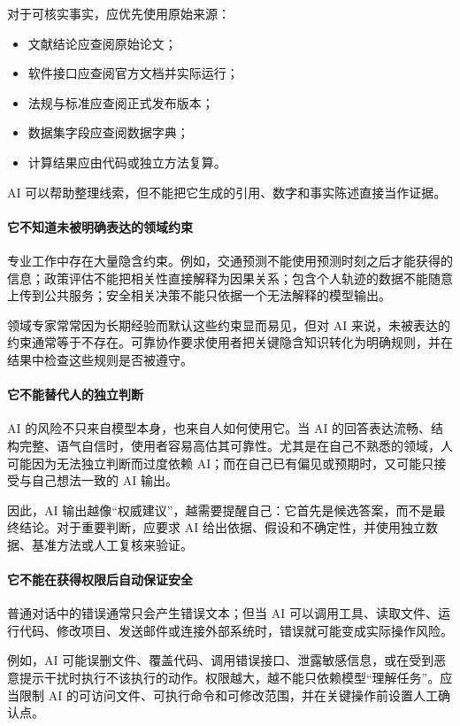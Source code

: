 对于可核实事实，应优先使用原始来源：

\begin{itemize}
\item 文献结论应查阅原始论文；
\item 软件接口应查阅官方文档并实际运行；
\item 法规与标准应查阅正式发布版本；
\item 数据集字段应查阅数据字典；
\item 计算结果应由代码或独立方法复算。
\end{itemize}

AI 可以帮助整理线索，但不能把它生成的引用、数字和事实陈述直接当作证据。

\paragraph{它不知道未被明确表达的领域约束}

专业工作中存在大量隐含约束。例如，交通预测不能使用预测时刻之后才能获得的信息；政策评估不能把相关性直接解释为因果关系；包含个人轨迹的数据不能随意上传到公共服务；安全相关决策不能只依据一个无法解释的模型输出。

领域专家常常因为长期经验而默认这些约束显而易见，但对 AI 来说，未被表达的约束通常等于不存在。可靠协作要求使用者把关键隐含知识转化为明确规则，并在结果中检查这些规则是否被遵守。

\paragraph{它不能替代人的独立判断}

AI 的风险不只来自模型本身，也来自人如何使用它。当 AI 的回答表达流畅、结构完整、语气自信时，使用者容易高估其可靠性。尤其是在自己不熟悉的领域，人可能因为无法独立判断而过度依赖 AI；而在自己已有偏见或预期时，又可能只接受与自己想法一致的 AI 输出。

因此，AI 输出越像“权威建议”，越需要提醒自己：它首先是候选答案，而不是最终结论。对于重要判断，应要求 AI 给出依据、假设和不确定性，并使用独立数据、基准方法或人工复核来验证。

\paragraph{它不能在获得权限后自动保证安全}

普通对话中的错误通常只会产生错误文本；但当 AI 可以调用工具、读取文件、运行代码、修改项目、发送邮件或连接外部系统时，错误就可能变成实际操作风险。

例如，AI 可能误删文件、覆盖代码、调用错误接口、泄露敏感信息，或在受到恶意提示干扰时执行不该执行的动作。权限越大，越不能只依赖模型“理解任务”。应当限制 AI 的可访问文件、可执行命令和可修改范围，并在关键操作前设置人工确认点。

